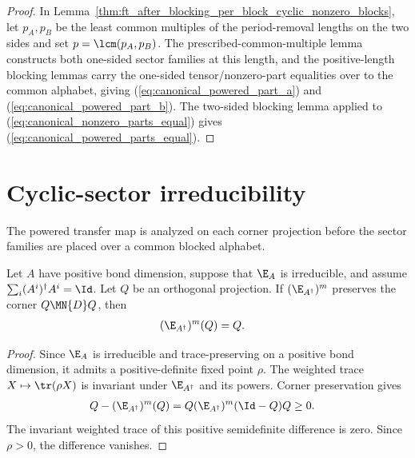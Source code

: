 \begin{proof}\leanok
    In Lemma~\ref{thm:ft_after_blocking_per_block_cyclic_nonzero_blocks}, let
    $p_A,p_B$ be the least common multiples of the period-removal lengths on the
    two sides and set $p=\lcm(p_A,p_B)$. The prescribed-common-multiple
    lemma constructs both one-sided sector families at this length, and the
    positive-length blocking lemmas carry the one-sided tensor/nonzero-part
    equalities over to the common alphabet, giving
    (\ref{eq:canonical_powered_part_a}) and
    (\ref{eq:canonical_powered_part_b}). The two-sided blocking lemma applied
    to (\ref{eq:canonical_nonzero_parts_equal}) gives
    (\ref{eq:canonical_powered_parts_equal}).
\end{proof}

\section{Cyclic-sector irreducibility}%
\label{subsec:internal_lean_only_labels}

The powered transfer map is analyzed on each corner projection before the
sector families are placed over a common blocked alphabet.

\begin{lemma}%
    \label{thm:adjoint_corner_fixed_of_preserved}
    \leanok
    Let $A$ have positive bond dimension, suppose that $\E_A$ is irreducible,
    and assume $\sum_i(A^i)^\dagger A^i=\Id$. Let $Q$ be an orthogonal
    projection. If $(\E_{A^\dagger})^m$ preserves the corner
    $Q\MN{D}Q$, then
    \begin{align}
        (\E_{A^\dagger})^m(Q) & =Q.
        \notag
    \end{align}
\end{lemma}

\begin{proof}\leanok
    Since $\E_A$ is irreducible and trace-preserving on a positive bond
    dimension, it admits a positive-definite fixed point $\rho$. The weighted
    trace $X\mapsto\tr(\rho X)$ is invariant under $\E_{A^\dagger}$ and its
    powers. Corner preservation gives
    \begin{align}
        Q-(\E_{A^\dagger})^m(Q)
         & =Q(\E_{A^\dagger})^m(\Id-Q)Q\ge0.
        \notag
    \end{align}
    The invariant weighted trace of this positive semidefinite difference is
    zero. Since $\rho>0$, the difference vanishes.
\end{proof}

